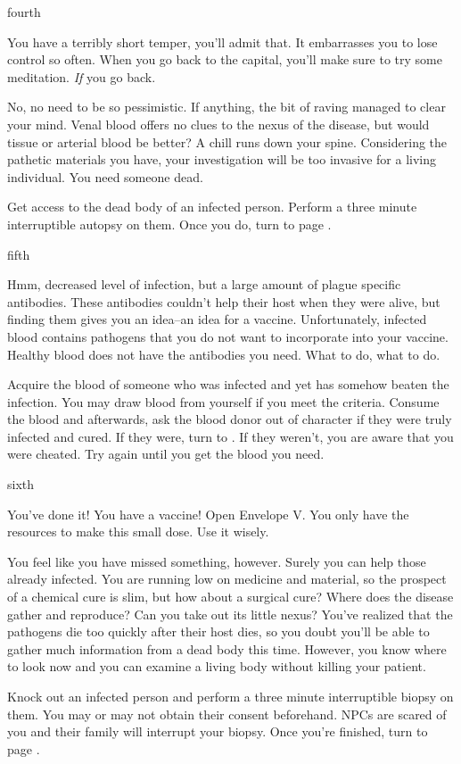 \documentclass[greennotebook]{Pestilence} %
\begin{document}
\begin{page}{fourth}

You have a terribly short temper, you'll admit that. It embarrasses you to lose control so often. When you go back to the capital, you'll make sure to try some meditation. \textit{If} you go back.

No, no need to be so pessimistic. If anything, the bit of raving managed to clear your mind. Venal blood offers no clues to the nexus of the disease, but would tissue or arterial blood be better? A chill runs down your spine. Considering the pathetic materials you have, your investigation will be too invasive for a living individual. You need someone dead.

Get access to the dead body of an infected person. Perform a three minute interruptible autopsy on them. Once you do, turn to page .

\end{page}

\begin{page}{fifth}

Hmm, decreased level of infection, but a large amount of plague specific antibodies. These antibodies couldn't help their host when they were alive, but finding them gives you an idea--an idea for a vaccine. Unfortunately, infected blood contains pathogens that you do not want to incorporate into your vaccine. Healthy blood does not have the antibodies you need. What to do, what to do.

Acquire the blood of someone who was infected and yet has somehow beaten the infection. You may draw blood from yourself if you meet the criteria. Consume the blood and afterwards, ask the blood donor out of character if they were truly infected and cured. If they were, turn to . If they weren't, you are aware that you were cheated. Try again until you get the blood you need.

\end{page}

\begin{page}{sixth}

You've done it! You have a vaccine! Open Envelope V. You only have the resources to make this small dose. Use it wisely.

You feel like you have missed something, however. Surely you can help those already infected. You are running low on medicine and material, so the prospect of a chemical cure is slim, but how about a surgical cure? Where does the disease gather and reproduce? Can you take out its little nexus? You've realized that the pathogens die too quickly after their host dies, so you doubt you'll be able to gather much information from a dead body this time. However, you know where to look now and you can examine a living body without killing your patient.

Knock out an infected person and perform a three minute interruptible biopsy on them. You may or may not obtain their consent beforehand. NPCs are scared of you and their family will interrupt your biopsy. Once you're finished, turn to page .

\end{page}
\end{document}
